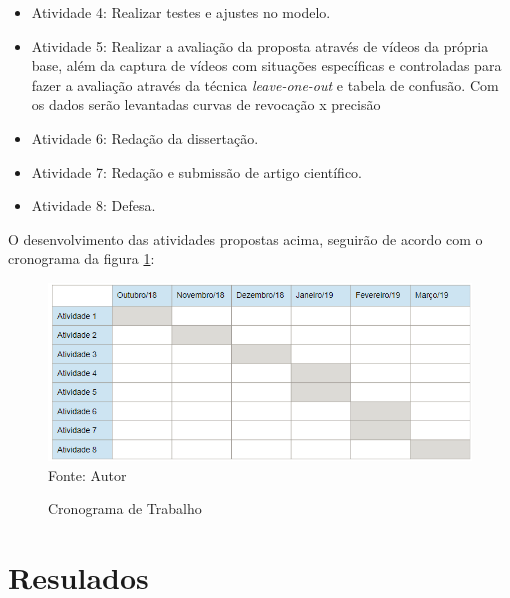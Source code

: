 \documentclass[
	12pt,				%
    oneside,			%
	a4paper,			%
	english,			%
	french,				%
	spanish,			%
	brazil,				%
	]{abntex2}
\begin{document}
\begin{itemize}
 \item Atividade 4: Realizar testes e ajustes no modelo.

 \item Atividade 5: Realizar a avaliação da proposta através de vídeos da própria base, além da captura de vídeos com situações específicas e controladas para fazer a avaliação através da técnica \textit{leave-one-out} e tabela de confusão. Com os dados serão levantadas curvas de revocação x precisão

 \item Atividade 6: Redação da dissertação.
 
  \item Atividade 7: Redação e submissão de artigo científico.

 \item Atividade 8: Defesa.

\end{itemize}

O desenvolvimento das atividades propostas acima, seguirão de acordo com o cronograma da figura \ref{fig:cronograma}:



\begin{figure}[H]
    \centering
    \caption{Cronograma de Trabalho}
    \includegraphics[width=\textwidth]{cronograma_qualificacao1}\\
    Fonte: Autor\hfill
    \label{fig:cronograma}
\end{figure} 


\chapter {Resulados}



\end{document}
